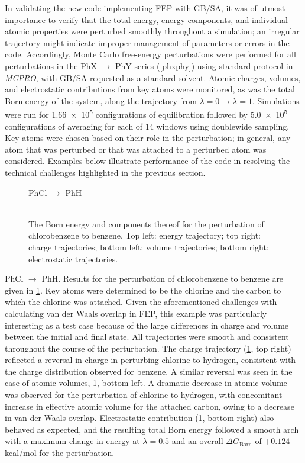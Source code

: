 \documentclass[12pt]{report}
\begin{document}
In validating the new code implementing FEP with GB/SA, it was of utmost importance to verify that the total energy, energy components, and individual atomic properties were perturbed smoothly throughout a simulation; an irregular trajectory might indicate improper management of parameters or errors in the code. Accordingly, Monte Carlo free-energy perturbations were performed for all perturbations in the PhX $\longrightarrow$ PhY series (\cref{phxphy}) using standard protocol in \textit{MCPRO}, with GB/SA requested as a standard solvent. Atomic charges, volumes, and electrostatic contributions from key atoms were monitored, as was the total Born energy of the system, along the trajectory from $\lambda = 0 \longrightarrow \lambda = 1$. Simulations were run for \num{1.66e5} configurations of equilibration followed by \num{5.0e5} configurations of averaging for each of 14 windows using doublewide sampling. Key atoms were chosen based on their role in the perturbation; in general, any atom that was perturbed or that was attached to a perturbed atom was considered. Examples below illustrate performance of the code in resolving the technical challenges highlighted in the previous section.

\begin{figure}[b!]
\centering
PhCl $\longrightarrow$ PhH\\
\hspace*{-1.3cm}\\
\hspace*{-1.3cm}
\caption{The Born energy and components thereof for the perturbation of chlorobenzene to benzene. Top left: energy trajectory; top right: charge trajectories; bottom left: volume trajectories; bottom right: electrostatic trajectories.}
\label{clh}
\end{figure}

PhCl $\longrightarrow$ PhH. Results for the perturbation of chlorobenzene to benzene are given in \cref{clh}. Key atoms were determined to be the chlorine and the carbon to which the chlorine was attached. Given the aforementioned challenges with calculating van der Waals overlap in FEP, this example was particularly interesting as a test case because of the large differences in charge and volume between the initial and final state. All trajectories were smooth and consistent throughout the course of the perturbation. The charge trajectory (\cref{clh}, top right) reflected a reversal in charge in perturbing chlorine to hydrogen, consistent with the charge distribution observed for benzene. A similar reversal was seen in the case of atomic volumes, \cref{clh}, bottom left. A dramatic decrease in atomic volume was observed for the perturbation of chlorine to hydrogen, with concomitant increase in effective atomic volume for the attached carbon, owing to a decrease in van der Waals overlap. Electrostatic contribution (\cref{clh}, bottom right) also behaved as expected, and the resulting total Born energy followed a smooth arch with a maximum change in energy at $\lambda = 0.5$ and an overall $\Delta G_{ \textrm{Born}}$ of $+0.124$ kcal/mol for the perturbation.
\end{document}
